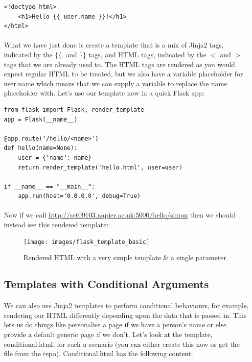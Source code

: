\documentclass[12pt, a4paper, oneside]{book}
\begin{document}
{\begin{lstlisting}
<!doctype html>
    <h1>Hello {{ user.name }}!</h1>
</html>
\end{lstlisting}

\paragraph{} What we have just done is create a template that is a mix of Jinja2 tags, indicated by the \{\{, and \}\} tags, and HTML tags, indicated by the $<$ and $>$ tags that we are already used to. The HTML tags are rendered as you would expect regular HTML to be treated, but we also have a variable placeholder for user.name which means that we can supply a variable to replace the name placeholder with. Let's use our template now in a quick Flask app:

\begin{lstlisting}
from flask import Flask, render_template
app = Flask(__name__)

@app.route('/hello/<name>')
def hello(name=None):
    user = {'name': name}
    return render_template('hello.html', user=user)

if __name__ == "__main__":
    app.run(host='0.0.0.0', debug=True)
\end{lstlisting}

\paragraph{} Now if we call \url{http://set09103.napier.ac.uk:5000/hello/simon} then we should instead see this rendered template:

\begin{figure}[H]
\centering
\texttt{[image: images/flask\_template\_basic]}
\caption{Rendered HTML with a very simple template \& a single parameter}
\label{fig:flask_template_basic}
\end{figure}


\subsection{Templates with Conditional Arguments}
\label{templates-conditional}
\paragraph{} We can also use Jinja2 templates to perform conditional behaviours, for example, rendering our HTML differently depending upon the data that is passed in. This lets us do things like personalise a page if we have a person's name or else provide a default generic page if we don't. Let's look at the template, conditional.html, for such a scenario (you can either create this now or get the file from the repo). Conditional.html has the following content:

}
\end{document}

